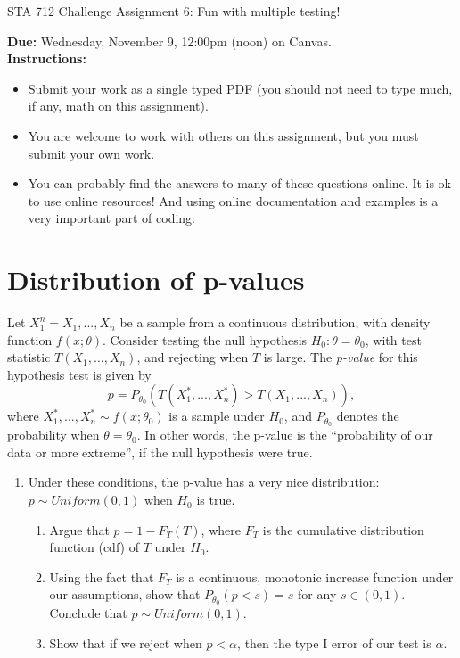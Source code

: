 \documentclass[11pt]{article}
\begin{document}
\begin{center}
\Large
STA 712 Challenge Assignment 6: Fun with multiple testing!\\
\normalsize
\vspace{5mm}
\end{center}

\noindent \textbf{Due:} Wednesday, November 9, 12:00pm (noon) on Canvas.\\ 

\noindent \textbf{Instructions:} 
\begin{itemize}
\item Submit your work as a single typed PDF (you should not need to type much, if any, math on this assignment).
\item You are welcome to work with others on this assignment, but you must submit your own work.
\item You can probably find the answers to many of these questions online. It is ok to use online resources! And using online documentation and examples is a very important part of coding.
\end{itemize}

\section*{Distribution of p-values}

Let $X_1^n = X_1,...,X_n$ be a sample from a continuous distribution, with density function $f(x; \theta)$. Consider testing the null hypothesis $H_0: \theta = \theta_0$, with test statistic $T(X_1,...,X_n)$, and rejecting when $T$ is large. The \textit{p-value} for this hypothesis test is given by
$$p = P_{\theta_0}(T(X_1^*,...,X_n^*) > T(X_1,...,X_n)),$$
where $X_1^*,...,X_n^* \sim f(x; \theta_0)$ is a sample under $H_0$, and $P_{\theta_0}$ denotes the probability when $\theta = \theta_0$. In other words, the p-value is the ``probability of our data or more extreme'', if the null hypothesis were true.\\

\begin{enumerate}
\item Under these conditions, the p-value has a very nice distribution: $p \sim Uniform(0, 1)$ when $H_0$ is true.
\begin{enumerate}
\item Argue that $p = 1 - F_T(T)$, where $F_T$ is the cumulative distribution function (cdf) of $T$ under $H_0$.

\item Using the fact that $F_T$ is a continuous, monotonic increase function under our assumptions, show that $P_{\theta_0}(p < s) = s$ for any $s \in (0, 1)$. Conclude that $p \sim Uniform(0, 1)$.

\item Show that if we reject when $p < \alpha$, then the type I error of our test is $\alpha$.
\end{enumerate}
\end{enumerate}
\end{document}
